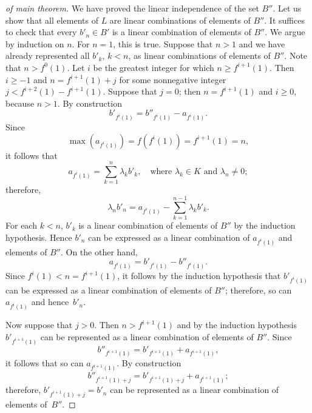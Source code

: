 \documentclass[a4paper]{amsart}
\theoremstyle{definition}
\let\ge\geqslant
\begin{document}
\begin{proof}[of main theorem]
We have proved the linear independence of the set $B''$. Let us show that all elements of $L$ 
are linear combinations of elements of $B''$. It suffices to check that every $b'_n\in B'$ 
is a linear combination of elements of $B''$. We argue by induction on $n$. For $n=1$, this is true. Suppose that 
$n>1$ and we have already represented all $b'_k$, $k<n$, as linear combinations of elements of $B''$. Note 
that $n> f^0(1)$. Let $i$ 
be the greatest integer for which $n\ge f^{i+1}(1)$. Then $i\ge -1$ and $n=f^{i+1}(1)+j$ for some nonnegative 
integer $j< f^{i+2}(1)-f^{i+1}(1)$. Suppose that $j=0$; then $n=f^{i+1}(1)$ and $i\ge 0$, because $n>1$. By construction  
$$ 
b'_{f^i(1)} = b''_{f^i(1)} - a_{f^i(1)}. 
$$ 
Since 
$$
\max(a_{f^i(1)})=f({f^i(1)})=f^{i+1}(1)=n,
$$ 
it follows that 
$$ 
a_{f^i(1)} = \sum_{k=1}^n \lambda_k b'_k,\quad \text{where $\lambda_k\in K$ and $\lambda_n\ne 0$};
$$ 
therefore, 
$$
\lambda_n b'_n= a_{f^i(1)} - \sum_{k=1}^{n-1} \lambda_k b'_k.
$$
For each $k< n$, $b'_k$ is a linear combination of elements of $B''$ by the induction 
hypothesis. Hence $b'_n$ can be expressed as a linear combination of $a_{f^i(1)}$ and elements of $B''$. 
On the other hand, 
$$ 
a_{f^i(1)}=b'_{f^i(1)} - b''_{f^i(1)}.
$$
Since $f^i(1)<n=f^{i+1}(1)$, it follows by the induction hypothesis that $b'_{f^i(1)}$ can be expressed as a linear 
combination of elements of $B''$; therefore, so can  $a_{f^i(1)}$ and hence~$b'_n$. 

Now suppose 
that $j> 0$. Then  $n>f^{i+1}(1)$ and  by the induction 
hypothesis  $b'_{f^{i+1}(1)}$ can be represented as a linear combination of elements of $B''$. Since 
$$
b''_{f^{i+1}(1)} = b'_{f^{i+1}(1)}+a_{f^{i+1}(1)},
$$ 
it follows that so can $a_{f^{i+1}(1)}$. By construction 
$$
b''_{f^{i+1}(1)+j} = b'_{f^{i+1}(1)+j}+a_{f^{i+1}(1)}; 
$$
therefore, $b'_{f^{i+1}(1)+j} = b'_n$ can be represented as a linear combination of elements of~$B''$.


\end{proof}
\end{document}

